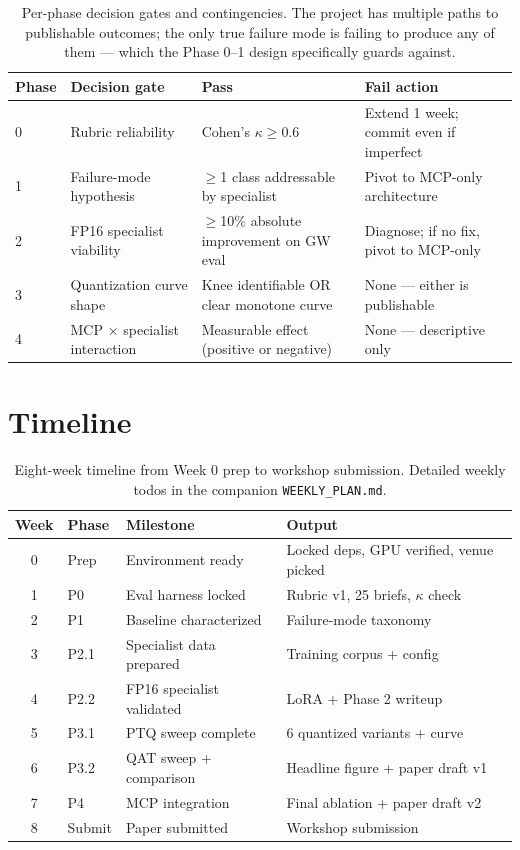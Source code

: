 \documentclass[11pt]{article}
\begin{document}
\begin{table}[ht]
\centering
\small
\begin{tabularx}{\textwidth}{lXXX}
\toprule
\textbf{Phase} & \textbf{Decision gate} & \textbf{Pass} & \textbf{Fail action} \\
\midrule
0 & Rubric reliability & Cohen's $\kappa \geq 0.6$ & Extend 1 week; commit even if imperfect \\
1 & Failure-mode hypothesis & $\geq$1 class addressable by specialist & Pivot to MCP-only architecture \\
2 & FP16 specialist viability & $\geq$10\% absolute improvement on GW eval & Diagnose; if no fix, pivot to MCP-only \\
3 & Quantization curve shape & Knee identifiable OR clear monotone curve & None --- either is publishable \\
4 & MCP $\times$ specialist interaction & Measurable effect (positive or negative) & None --- descriptive only \\
\bottomrule
\end{tabularx}
\caption{Per-phase decision gates and contingencies. The project has multiple paths to publishable outcomes; the only true failure mode is failing to produce any of them --- which the Phase 0--1 design specifically guards against.}
\end{table}

\section{Timeline}

\begin{table}[ht]
\centering
\small
\begin{tabular}{c l l l}
\toprule
\textbf{Week} & \textbf{Phase} & \textbf{Milestone} & \textbf{Output} \\
\midrule
0 & Prep   & Environment ready             & Locked deps, GPU verified, venue picked \\
1 & P0     & Eval harness locked           & Rubric v1, 25 briefs, $\kappa$ check \\
2 & P1     & Baseline characterized        & Failure-mode taxonomy \\
3 & P2.1   & Specialist data prepared      & Training corpus + config \\
4 & P2.2   & FP16 specialist validated     & LoRA + Phase 2 writeup \\
5 & P3.1   & PTQ sweep complete            & 6 quantized variants + curve \\
6 & P3.2   & QAT sweep + comparison        & Headline figure + paper draft v1 \\
7 & P4     & MCP integration               & Final ablation + paper draft v2 \\
8 & Submit & Paper submitted               & Workshop submission \\
\bottomrule
\end{tabular}
\caption{Eight-week timeline from Week 0 prep to workshop submission. Detailed weekly todos in the companion \texttt{WEEKLY\_PLAN.md}.}
\end{table}
\end{document}
